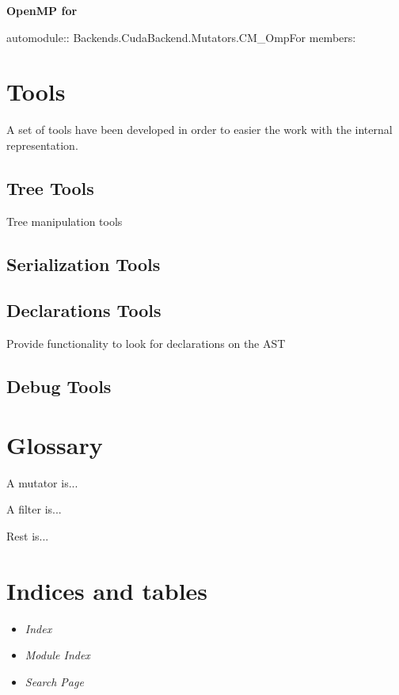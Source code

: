 \documentclass[a4paper,10pt,english]{manual}
\begin{document}
\textbf{OpenMP for}

automodule:: Backends.CudaBackend.Mutators.CM\_OmpFor
members:

\resetcurrentobjects
\hypertarget{--doc-tools}{}

\chapter{Tools}
\hypertarget{module-Tools}{}
\modulesynopsis{}
A set of tools have been developed in order to easier the work with the internal representation.


\section{Tree Tools}

Tree manipulation tools


\section{Serialization Tools}


\section{Declarations Tools}

Provide functionality to look for declarations on the AST


\section{Debug Tools}

\resetcurrentobjects
\hypertarget{--doc-glossary}{}

\chapter{Glossary}
\begin{description}
\item[Mutator] \leavevmode\hypertarget{term-mutator}{}
A mutator is...

\item[Filter] \leavevmode\hypertarget{term-filter}{}
A filter is...

\item[Rest] \leavevmode\hypertarget{term-rest}{}
Rest is...

\end{description}


\chapter{Indices and tables}
\begin{itemize}
\item {} 
\emph{Index}

\item {} 
\emph{Module Index}

\item {} 
\emph{Search Page}

\end{itemize}


\renewcommand{\indexname}{Module Index}
\printmodindex
\renewcommand{\indexname}{Index}
\printindex
\end{document}
